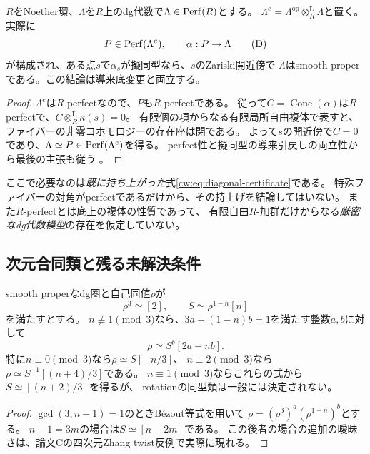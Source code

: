 \begin{proposition}[有限対角証明書によるsaturationの開近傍]
\label{cw:prop:diagonal-certificate}
$R$をNoether環、$\Lambda$を$R$上のdg代数で$\Lambda\in\operatorname{Perf}(R)$とする。
$\Lambda^e=\Lambda^{\mathrm{op}}\otimes_R^{\mathbf L}\Lambda$と置く。
実際に
\[
 P\in\operatorname{Perf}(\Lambda^e),\qquad \alpha:P\to\Lambda
 \tag{D}\label{cw:eq:diagonal-certificate}
\]
が構成され、ある点$s$で$\alpha_s$が擬同型なら、$s$のZariski開近傍で
$\Lambda$はsmooth properである。この結論は導来底変更と両立する。
\end{proposition}
\begin{proof}
$\Lambda^e$は$R$-perfectなので、$P$も$R$-perfectである。
従って$C=\operatorname{Cone}(\alpha)$は$R$-perfectで、$C\otimes_R^{\mathbf L}\kappa(s)=0$。
有限個の項からなる有限局所自由複体で表すと、ファイバーの非零コホモロジーの存在座は閉である。
よって$s$の開近傍で$C=0$であり、$\Lambda\simeq P\in\operatorname{Perf}(\Lambda^e)$を得る。
perfect性と擬同型の導来引戻しの両立性から最後の主張も従う
\cite[Tag 0BDK]{Stacks}。
\end{proof}
\begin{remark}
ここで必要なのは\emph{既に持ち上がった}式\eqref{cw:eq:diagonal-certificate}である。
特殊ファイバーの対角がperfectであるだけから、その持上げを結論してはいない。
また$R$-perfectとは底上の複体の性質であって、
有限自由$R$-加群だけからなる\emph{厳密なdg代数模型}の存在を仮定していない。
\end{remark}

\subsection{次元合同類と残る未解決条件}

\begin{proposition}[Serre関手からのrotationの復元]
\label{prop:all-components-rotation-serre}
smooth properなdg圏と自己同値$\rho$が
\begin{equation}\label{eq:all-components-serre}
 \rho^3\simeq[2],\qquad S\simeq\rho^{1-n}[n]
\end{equation}
を満たすとする。
$n\not\equiv1\pmod3$なら、$3a+(1-n)b=1$を満たす整数$a,b$に対して
\begin{equation}\label{eq:all-components-rotation}
 \rho\simeq S^b[2a-nb].
\end{equation}
特に$n\equiv0\pmod3$なら$\rho\simeq S[-n/3]$、
$n\equiv2\pmod3$なら$\rho\simeq S^{-1}[(n+4)/3]$である。
$n\equiv1\pmod3$ならこれらの式から$S\simeq[(n+2)/3]$を得るが、
rotationの同型類は一般には決定されない。
\end{proposition}
\begin{proof}
$\gcd(3,n-1)=1$のときBézout等式を用いて
$\rho=(\rho^3)^a(\rho^{1-n})^b$とする。
$n-1=3m$の場合は$S\simeq[n-2m]$である。
この後者の場合の追加の曖昧さは、論文Cの四次元Zhang twist反例で実際に現れる。
\end{proof}

